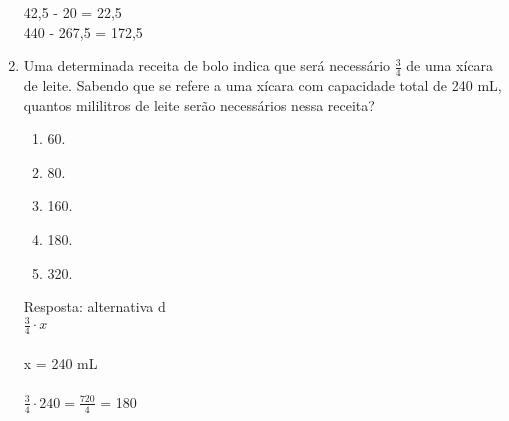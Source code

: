 \documentclass[a4paper,14pt]{article}
\begin{document}
\begin{enumerate}
		42,5 - 20 = 22,5 \\
		440 - 267,5 = 172,5
		
		\vspace{1cm}

	    
	    \item Uma determinada receita de bolo indica que será necessário \(\frac{3}{4}\)
	    de uma xícara de leite. Sabendo que se
	    refere a uma xícara com capacidade total de 240 mL, quantos mililitros de leite serão necessários nessa
	    receita?
	    \begin{enumerate}
	    	\item 60.
	    	\item 80.
	    	\item 160.
	    	\item 180.
	    	\item 320.
	    \end{enumerate}
		Resposta: alternativa d
		\newline
		\\
		$\frac{3}{4} \cdot x$ \\ \\
		x = 240 mL \\ \\
		$\frac{3}{4} \cdot 240 = \frac{720}{4}$ = 180 \\

	    \vspace{0cm}
	    

\end{enumerate}
\end{document}
